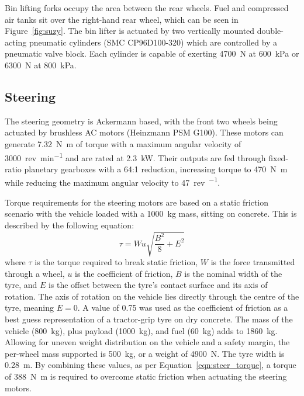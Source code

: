 \documentclass[preprint,authoryear,12pt]{elsarticle}
\begin{document}
        Bin lifting forks occupy the area between the rear wheels.
        Fuel and compressed air tanks sit over the right-hand rear wheel, which can be seen in Figure~\ref{fig:suzy}.
        The bin lifter is actuated by two vertically mounted double-acting pneumatic cylinders (SMC CP96D100-320) which are controlled by a pneumatic valve block.
        Each cylinder is capable of exerting \SI{4700}{\newton} at \SI{600}{\kilo\pascal} or \SI{6300}{\newton} at \SI{800}{\kilo\pascal}.


    \subsection{Steering}
    \label{sub:steering}

        The steering geometry is Ackermann based, with the front two wheels being actuated by brushless AC motors (Heinzmann PSM G100).
        These motors can generate \SI{7.32}{\newton\meter} of torque with a maximum angular velocity of \SI{3000}{rev\per\minute} and are rated at \SI{2.3}{\kilo\watt}.
        Their outputs are fed through fixed-ratio planetary gearboxes with a 64:1 reduction, increasing torque to \SI{470}{\newton\meter} while reducing the maximum angular velocity to \SI{47}{rev\per\min}.

        Torque requirements for the steering motors are based on a static friction scenario with the vehicle loaded with a \SI{1000}{\kilo\gram} mass, sitting on concrete.
        This is described by the following equation:
        \begin{equation}
        \label{eqn:steer_torque}
        \tau = W u \sqrt{\frac{B^2}{8} + E^2}
        \end{equation}
        where $\tau$ is the torque required to break static friction, $W$ is the force transmitted through a wheel, $u$ is the coefficient of friction, $B$ is the nominal width of the tyre, and $E$ is the offset between the tyre's contact surface and its axis of rotation.
        The axis of rotation on the vehicle lies directly through the centre of the tyre, meaning $E=0$.
        A value of 0.75 was used as the coefficient of friction as a best guess representation of a tractor-grip tyre on dry concrete.
        The mass of the vehicle (\SI{800}{\kilo\gram}), plus payload (\SI{1000}{\kilo\gram}), and fuel (\SI{60}{\kilo\gram}) adds to \SI{1860}{\kilo\gram}.
        Allowing for uneven weight distribution on the vehicle and a safety margin, the per-wheel mass supported is \SI{500}{\kilo\gram}, or a weight of \SI{4900}{\newton}.
        The tyre width is \SI{0.28}{\meter}.
        By combining these values, as per Equation~\ref{eqn:steer_torque}, a torque of \SI{388}{\newton\meter} is required to overcome static friction when actuating the steering motors.
\end{document}

